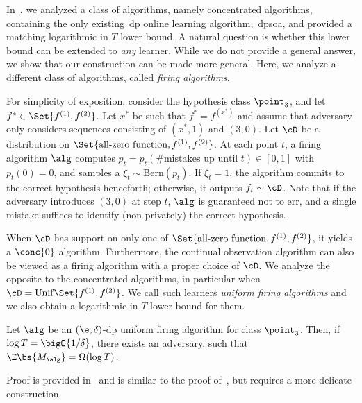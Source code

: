 In~, we analyzed a class of algorithms, namely concentrated algorithms, containing the only existing~\Gls{dp} online learning algorithm,~\Gls{dpsoa}, 
and provided a matching logarithmic in \(T\) lower bound.
A natural question is whether this lower bound can be extended to \textit{any} learner. While we do not provide a general answer, we show that our construction can be made more general. Here, we analyze a different class of algorithms, called \emph{firing algorithms}.

For simplicity of exposition, consider the hypothesis class \(\point_3\), 
and let \(f^{\ast} \in \Set{f^{(1)}, f^{(2)}}\).
Let \(x^\ast\) be such that \(f^\ast = f^{(x^\ast)}\) and assume that adversary only considers sequences consisting of \((x^\ast, 1)\) and \((3, 0)\).
Let \(\cD\) be a distribution on \(\Set{\text{all-zero function}, f^{(1)}, f^{(2)}}\).
At each point \(t\), a firing algorithm \(\alg\) computes \(p_t = p_t(\#\text{mistakes up until }t) \in [0, 1]\) with \(p_t(0) = 0\), and samples a \(\xi_t \sim \mathrm{Bern}(p_t)\). If \(\xi_t = 1\), the algorithm commits to the correct hypothesis henceforth; otherwise, it outputs \(f_t \sim \cD\). Note that if the adversary introduces \((3, 0)\) at step \(t\), \(\alg\) is guaranteed not to err, and a single mistake suffices to identify (non-privately) the correct hypothesis.

When \(\cD\) has support on only one of \(\Set{\text{all-zero function}, f^{(1)}, f^{(2)}}\), it yields a \(\conc{0}\) algorithm.
Furthermore, the continual observation algorithm can also be viewed as a firing algorithm with a proper choice of \(\cD\). We analyze the opposite to the concentrated algorithms, in particular when \(\cD = \mathrm{Unif}\Set{f^{(1)}, f^{(2)}}\). We call such learners \emph{uniform firing algorithms} and we also obtain a logarithmic in \(T\) lower bound for them.

\begin{proposition}\label{prop:firing-lb}
    Let \(\alg\) be an \((\e, \delta)\)-\Gls{dp} uniform firing algorithm for class \(\point_3\).
    Then, if \(\log T = \bigO{1 / \delta}\), there exists an adversary, such that \(\E \bs{M_{\alg}} = \Omega(\log T)\). 
\end{proposition}

Proof is provided in~ and is similar to the proof of~, but requires a more delicate construction. 